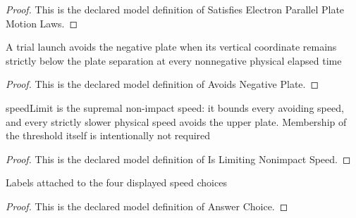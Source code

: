 \begin{proof}
  This is the declared model definition of Satisfies Electron Parallel Plate Motion Laws.
\end{proof}
\begin{definition}
  \label{def:physics:phyx-mini-0837:phyxminiproblems-problemphyxmini0837-avoidsnegativeplate}
  A trial launch avoids the negative plate when its vertical coordinate remains strictly below the plate separation at every nonnegative physical elapsed time
\end{definition}
\begin{proof}
  This is the declared model definition of Avoids Negative Plate.
\end{proof}
\begin{definition}
  \label{def:physics:phyx-mini-0837:phyxminiproblems-problemphyxmini0837-islimitingnonimpactspeed}
  speedLimit is the supremal non-impact speed: it bounds every avoiding speed, and every strictly slower physical speed avoids the upper plate. Membership of the threshold itself is intentionally not required
\end{definition}
\begin{proof}
  This is the declared model definition of Is Limiting Nonimpact Speed.
\end{proof}
\begin{definition}
  \label{def:physics:phyx-mini-0837:phyxminiproblems-problemphyxmini0837-answerchoice}
  Labels attached to the four displayed speed choices
\end{definition}
\begin{proof}
  This is the declared model definition of Answer Choice.
\end{proof}
